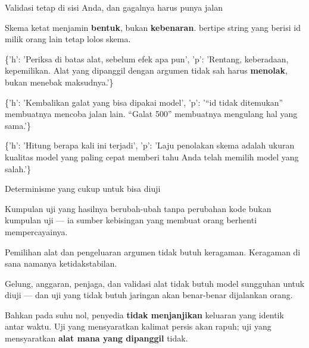 \documentclass[aspectratio=169,11pt,t]{beamer}
\begin{document}
\begin{frame}[shrink=25]{Validasi tetap di sisi Anda, dan gagalnya harus punya jalan}
{\fontsize{9.4}{12.6}\selectfont\color{fg2}Skema ketat menjamin \textbf{bentuk}, bukan \textbf{kebenaran}.  bertipe string yang berisi id milik orang lain tetap lolos skema.\par}\vskip 4pt
\begin{isteps}
\item \{'h': 'Periksa di batas alat, sebelum efek apa pun', 'p': 'Rentang, keberadaan, kepemilikan. Alat yang dipanggil dengan argumen tidak sah harus \textbf{menolak}, bukan menebak maksudnya.'\}
\item \{'h': 'Kembalikan galat yang bisa dipakai model', 'p': '``id tidak ditemukan'' membuatnya mencoba jalan lain. ``Galat 500'' membuatnya mengulang hal yang sama.'\}
\item \{'h': 'Hitung berapa kali ini terjadi', 'p': 'Laju penolakan skema adalah ukuran kualitas model yang paling cepat memberi tahu Anda telah memilih model yang salah.'\}
\end{isteps}
\end{frame}

\begin{frame}[shrink=25]{Determinisme yang cukup untuk bisa diuji}
{\fontsize{9.4}{12.6}\selectfont\color{fg2}Kumpulan uji yang hasilnya berubah-ubah tanpa perubahan kode bukan kumpulan uji --- ia sumber kebisingan yang membuat orang berhenti mempercayainya.\par}\vskip 4pt
\begin{minipage}[t]{0.494\textwidth}
\begin{icardgood}
Pemilihan alat dan pengeluaran argumen tidak butuh keragaman. Keragaman di sana namanya ketidakstabilan.
\end{icardgood}
\end{minipage}%
\hfill
\begin{minipage}[t]{0.494\textwidth}
\begin{icardgood}
Gelung, anggaran, penjaga, dan validasi alat tidak butuh model sungguhan untuk diuji --- dan uji yang tidak butuh jaringan akan benar-benar dijalankan orang.
\end{icardgood}
\end{minipage}%
\begin{iband}[signal]
Bahkan pada suhu nol, penyedia \textbf{tidak menjanjikan} keluaran yang identik antar waktu. Uji yang mensyaratkan kalimat persis akan rapuh; uji yang mensyaratkan \textbf{alat mana yang dipanggil} tidak.
\end{iband}
\end{frame}
\end{document}
